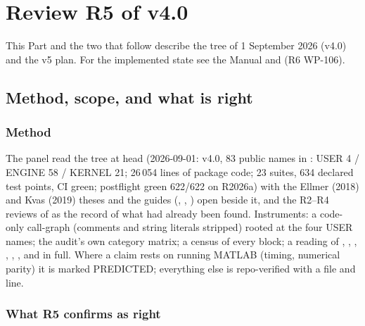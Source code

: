 \part{Review R5 of \lsq{} v4.0}
\begin{principle}
This Part and the two that follow describe the tree of 1 September 2026 (v4.0) and the v5 plan. For the implemented state see the Manual and  (R6 WP-106).
\end{principle}

\chapter{Method, scope, and what is right}
\label{ch:review}

\section{Method}

The panel read the tree at  head  (2026-09-01: v4.0, 83 public names in : USER 4 / ENGINE 58 / KERNEL 21; 26\,054 lines of package code; 23 suites, 634 declared test points, CI green; postflight green 622/622 on R2026a) with the Ellmer (2018) and Kvas (2019) theses and the  guides (, , ) open beside it, and the R2--R4 reviews of  as the record of what had already been found. Instruments: a code-only call-graph (comments and string literals stripped) rooted at the four USER names; the audit's own category matrix; a census of every  block; a reading of , , , , , ,  and  in full. Where a claim rests on running MATLAB (timing, numerical parity) it is marked PREDICTED; everything else is repo-verified with a file and line.

\section{What R5 confirms as right}

